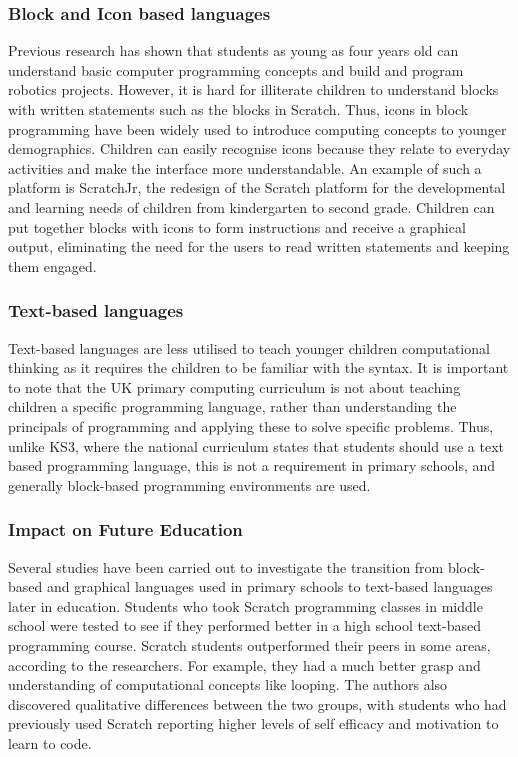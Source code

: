 \documentclass[oneside,%
                    author={Malak Hajji},
                    degree={BSc},
                    title={Designing An Accessible Ozobot Programming Platform for Students},
                  subtitle={With Mixed Visual Abilities}]{dissertation}
\begin{document}
\subsubsection{Block and Icon based languages}
Previous research has shown that students as young as four years old can understand basic computer programming concepts and build and program robotics projects\cite{bers}. However, it is hard for illiterate children to understand blocks with written statements such as the blocks in Scratch. Thus, icons in block programming have been widely used to introduce computing concepts to younger demographics. Children can easily recognise icons because they relate to everyday activities and make the interface more understandable. 
An example of such a platform is ScratchJr\cite{scratchjr}, the redesign of the Scratch platform for the developmental and learning needs of children from kindergarten to second grade. Children can put together blocks with icons to form instructions and receive a graphical output, eliminating the need for the users to read written statements and keeping them engaged.

\subsubsection{Text-based languages}

Text-based languages are less utilised to teach younger children computational thinking as it requires the children to be familiar with the syntax. It is important to note that the UK primary computing curriculum is not about teaching children a specific programming language, rather than understanding the principals of programming and applying these to solve specific problems\cite{curricula}. Thus, unlike KS3, where the national curriculum states that students should use a text based programming language, this is not a requirement in primary schools, and generally block-based programming environments are used.

\subsubsection{Impact on Future Education }
Several studies have been carried out to investigate the transition from block-based and graphical languages used in primary schools to text-based languages later in education. Students who took Scratch programming classes in middle school were tested to see if they performed better in a high school text-based programming course\cite{phd}. Scratch students outperformed their peers in some areas, according to the researchers. For example, they had a much better grasp and understanding of computational concepts like looping. The authors also discovered qualitative differences between the two groups, with students who had previously used Scratch reporting higher levels of self efficacy and motivation to learn to code.
\end{document}
